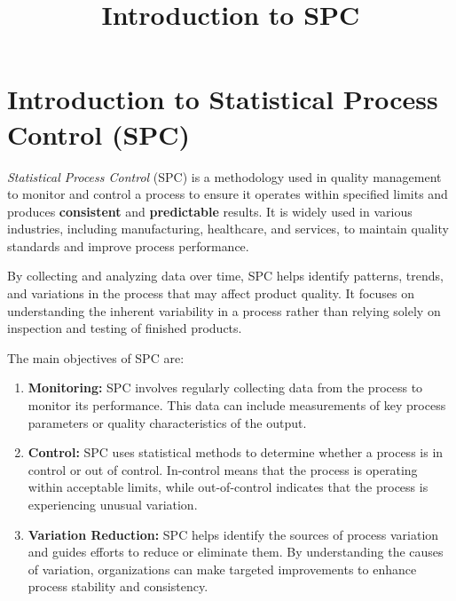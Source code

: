 \documentclass{ximera}
\title{Introduction to SPC}
\begin{document}
\begin{abstract}
\end{abstract}
 
\maketitle

\section*{Introduction to Statistical Process Control (SPC)}

\emph{Statistical Process Control} (SPC) is a methodology used in quality management to monitor and control a process to ensure it operates within specified limits and produces {\bf consistent} and {\bf predictable} results. It is widely used in various industries, including manufacturing, healthcare, and services, to maintain quality standards and improve process performance.

By collecting and analyzing data over time, SPC helps identify patterns, trends, and variations in the process that may affect product quality. It focuses on understanding the inherent variability in a process rather than relying solely on inspection and testing of finished products.

The main objectives of SPC are:
\begin{enumerate}

\item {\bf Monitoring:} SPC involves regularly collecting data from the process to monitor its performance. This data can include measurements of key process parameters or quality characteristics of the output.

\item {\bf Control:} SPC uses statistical methods to determine whether a process is in control or out of control. In-control means that the process is operating within acceptable limits, while out-of-control indicates that the process is experiencing unusual variation.

\item {\bf Variation Reduction:} SPC helps identify the sources of process variation and guides efforts to reduce or eliminate them. By understanding the causes of variation, organizations can make targeted improvements to enhance process stability and consistency.
\end{enumerate}
\end{document}
